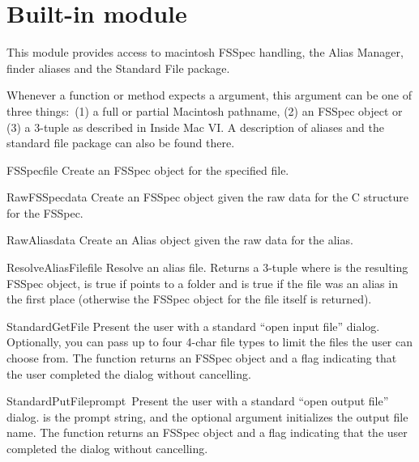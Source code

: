\section{Built-in module }

\renewcommand{\indexsubitem}{(in module macfs)}

This module provides access to macintosh FSSpec handling, the Alias
Manager, finder aliases and the Standard File package.

Whenever a function or method expects a  argument, this
argument can be one of three things:\ (1) a full or partial Macintosh
pathname, (2) an FSSpec object or (3) a 3-tuple  as described in Inside Mac VI\@. A description of aliases
and the standard file package can also be found there.

\begin{funcdesc}{FSSpec}{file}
Create an FSSpec object for the specified file.
\end{funcdesc}

\begin{funcdesc}{RawFSSpec}{data}
Create an FSSpec object given the raw data for the C structure for the
FSSpec.
\end{funcdesc}

\begin{funcdesc}{RawAlias}{data}
Create an Alias object given the raw data for the alias.
\end{funcdesc}

\begin{funcdesc}{ResolveAliasFile}{file}
Resolve an alias file. Returns a 3-tuple  where  is the resulting FSSpec object,
 is true if  points to a folder and
 is true if the file was an alias in the first place
(otherwise the FSSpec object for the file itself is returned).
\end{funcdesc}

\begin{funcdesc}{StandardGetFile}{}
Present the user with a standard ``open input file''
dialog. Optionally, you can pass up to four 4-char file types to limit
the files the user can choose from. The function returns an FSSpec
object and a flag indicating that the user completed the dialog
without cancelling.
\end{funcdesc}

\begin{funcdesc}{StandardPutFile}{prompt\, }
Present the user with a standard ``open output file''
dialog.  is the prompt string, and the optional
 argument initializes the output file name. The function
returns an FSSpec object and a flag indicating that the user completed
the dialog without cancelling.
\end{funcdesc}

